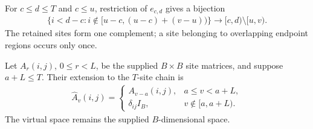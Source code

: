 \begin{definition}
    \label{def:physical_interval_complement_coordinates}
    \leanok
    For $c\le d\le T$ and $c\le u$, restriction of $e_{c,d}$ gives a
    bijection
    \begin{align}
        \{i<d-c:i\notin[u-c,(u-c)+(v-u))\}
        \longrightarrow
        [c,d)\setminus
        [u,v).
        \label{eq:physical_interval_complement_coordinates}
    \end{align}
    The retained sites form one complement; a site belonging to overlapping
    endpoint regions occurs only once.
\end{definition}

\begin{definition}
    \label{def:physical_interval_identity_extension}
    \leanok
    Let $A_r(i,j)$, $0\le r<L$, be the supplied $B\times B$ site matrices,
    and suppose $a+L\le T$. Their extension to the $T$-site chain is
    \begin{align}
        \widehat A_v(i,j)=
        \begin{cases}
            A_{v-a}(i,j),   & a\le v<a+L,     \\
            \delta_{ij}I_B, & v\notin[a,a+L).
        \end{cases}
        \label{eq:physical_interval_identity_extension}
    \end{align}
    The virtual space remains the supplied $B$-dimensional space.
\end{definition}

